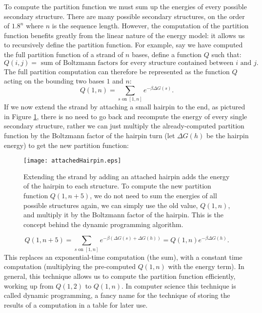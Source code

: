 To compute the partition function we must sum up the energies of every
possible secondary structure. There are many possible secondary
structures, on the order of $1.8^n$ where $n$ is the sequence
length. However, the computation of the partition function benefits
greatly from the linear nature of the energy model: it allows us to
recursively define the partition function. For example, say we have
computed the full partition function of a strand of $n$ bases, define
a function $Q$ such that:
\begin{equation}
Q(i, j) = \text { sum of Boltzmann factors for every structure contained between } i \text{ and } j.
\end{equation}
The full partition computation can therefore be represented as the
function $Q$ acting on the bounding two bases $1$ and $n$: 
\begin{equation}
 Q(1, n) = \sum_{s \text{ on } [1,n]} e^{-\beta \Delta G(s)}.
\end{equation}
If we now extend the strand by attaching a small hairpin to the end,
as pictured in Figure \ref{fig:attachedHairpin}, there is no need to
go back and recompute the energy of every single secondary structure,
rather we can just multiply the already-computed partition function by
the Boltzmann factor of the hairpin turn (let $\Delta G(h)$ be the hairpin
energy) to get the new partition function:
\begin{figure}[t]
\texttt{[image: attachedHairpin.eps]}
\caption[Attaching a Hairpin]{Extending the strand by adding an attached hairpin adds the
  energy of the hairpin to each structure. To compute the new
  partition function $Q(1, n+5)$, we do not need to sum the energies
  of all possible structures again, we can simply use the old value,
  $Q(1,n)$, and multiply it by the Boltzmann factor of the
  hairpin. This is the concept behind the dynamic programming
  algorithm.}
\label{fig:attachedHairpin}
\end{figure}
\begin{equation}
Q(1, n + 5) = \sum_{s \text{ on } [1,n]} e^{-\beta (\Delta G(s) + \Delta G(h))} = Q(1, n)e^{-\beta \Delta G(h)}. 
\end{equation}
This replaces an exponential-time computation (the sum), with a
constant time computation (multiplying the pre-computed $Q(1, n)$ with
the energy term). In general, this technique allows us to compute the
partition function efficiently, working up from $Q(1, 2)$ to
$Q(1,n)$. In computer science this technique is called dynamic
programming, a fancy name for the technique of storing the
results of a computation in a table for later use.

